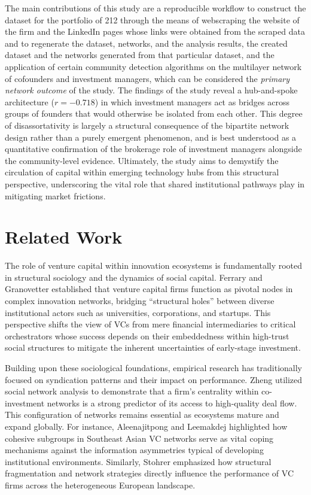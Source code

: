 \documentclass[conference]{IEEEtran}
\begin{document}
The main contributions of this study are a reproducible workflow to construct the dataset for the portfolio of 212 through the means of webscraping the website of the firm \cite{212portfolio} and the LinkedIn pages whose links were obtained from the scraped data and to regenerate the dataset, networks, and the analysis results, the created dataset and the networks generated from that particular dataset, and the application of certain community detection algorithms on the multilayer network of cofounders and investment managers, which can be considered the \emph{primary network outcome} of the study. The findings of the study reveal a hub-and-spoke architecture ($r = -0.718$) in which investment managers act as bridges across groups of founders that would otherwise be isolated from each other. This degree of disassortativity is largely a structural consequence of the bipartite network design rather than a purely emergent phenomenon, and is best understood as a quantitative confirmation of the brokerage role of investment managers alongside the community-level evidence. Ultimately, the study aims to demystify the circulation of capital within emerging technology hubs from this structural perspective, underscoring the vital role that shared institutional pathways play in mitigating market frictions.

\section{Related Work}

The role of venture capital within innovation ecosystems is fundamentally rooted in structural sociology and the dynamics of social capital. Ferrary and Granovetter \cite{ferrary2009} established that venture capital firms function as pivotal nodes in complex innovation networks, bridging ``structural holes'' between diverse institutional actors such as universities, corporations, and startups. This perspective shifts the view of VCs from mere financial intermediaries to critical orchestrators whose success depends on their embeddedness within high-trust social structures to mitigate the inherent uncertainties of early-stage investment.

Building upon these sociological foundations, empirical research has traditionally focused on syndication patterns and their impact on performance. Zheng \cite{zheng2004} utilized social network analysis to demonstrate that a firm's centrality within co-investment networks is a strong predictor of its access to high-quality deal flow. This configuration of networks remains essential as ecosystems mature and expand globally. For instance, Aleenajitpong and Leemakdej \cite{aleenajitpong2021} highlighted how cohesive subgroups in Southeast Asian VC networks serve as vital coping mechanisms against the information asymmetries typical of developing institutional environments. Similarly, Stohrer \cite{stohrer2025} emphasized how structural fragmentation and network strategies directly influence the performance of VC firms across the heterogeneous European landscape.
\end{document}
